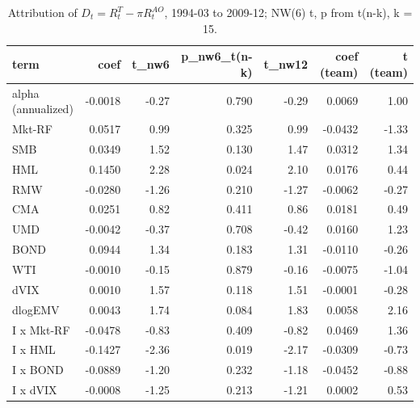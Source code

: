 \begin{table}[htbp]\centering\small
\caption{Attribution of $D_t = R^T_t - \pi R^{AO}_t$, 1994-03 to 2009-12; NW(6) t, p from t(n-k), k = 15.}
\label{tab:m8_attribution}
\begin{tabular}{lrrrrrr}
\toprule
term & coef & t\_nw6 & p\_nw6\_t(n-k) & t\_nw12 & coef (team) & t (team) \\
\midrule
alpha (annualized) & -0.0018 & -0.27 & 0.790 & -0.29 & 0.0069 & 1.00 \\
Mkt-RF & 0.0517 & 0.99 & 0.325 & 0.99 & -0.0432 & -1.33 \\
SMB & 0.0349 & 1.52 & 0.130 & 1.47 & 0.0312 & 1.34 \\
HML & 0.1450 & 2.28 & 0.024 & 2.10 & 0.0176 & 0.44 \\
RMW & -0.0280 & -1.26 & 0.210 & -1.27 & -0.0062 & -0.27 \\
CMA & 0.0251 & 0.82 & 0.411 & 0.86 & 0.0181 & 0.49 \\
UMD & -0.0042 & -0.37 & 0.708 & -0.42 & 0.0160 & 1.23 \\
BOND & 0.0944 & 1.34 & 0.183 & 1.31 & -0.0110 & -0.26 \\
WTI & -0.0010 & -0.15 & 0.879 & -0.16 & -0.0075 & -1.04 \\
dVIX & 0.0010 & 1.57 & 0.118 & 1.51 & -0.0001 & -0.28 \\
dlogEMV & 0.0043 & 1.74 & 0.084 & 1.83 & 0.0058 & 2.16 \\
I x Mkt-RF & -0.0478 & -0.83 & 0.409 & -0.82 & 0.0469 & 1.36 \\
I x HML & -0.1427 & -2.36 & 0.019 & -2.17 & -0.0309 & -0.73 \\
I x BOND & -0.0889 & -1.20 & 0.232 & -1.18 & -0.0452 & -0.88 \\
I x dVIX & -0.0008 & -1.25 & 0.213 & -1.21 & 0.0002 & 0.53 \\
\bottomrule
\end{tabular}
\end{table}
